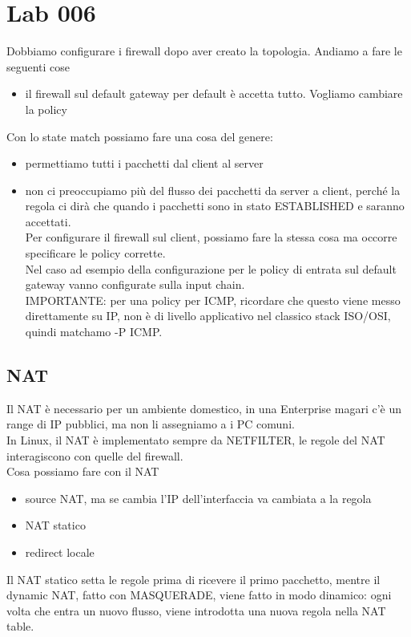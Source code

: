 \documentclass[12pt, oneside]{extbook} %
\begin{document}
\section*{Lab 006}
Dobbiamo configurare i firewall dopo aver creato la topologia. Andiamo a fare le seguenti cose
\begin{itemize}
\item il firewall sul default gateway per default è accetta tutto. Vogliamo cambiare la policy
\end{itemize}
Con lo state match possiamo fare una cosa del genere:
\begin{itemize}
\item permettiamo tutti i pacchetti dal client al server
\item non ci preoccupiamo più del flusso dei pacchetti da server a client, perché la regola ci dirà che quando i pacchetti sono in stato ESTABLISHED e saranno accettati.
\\Per configurare il firewall sul client, possiamo fare la stessa cosa ma occorre specificare le policy corrette.
\\Nel caso ad esempio della configurazione per le policy di entrata sul default gateway vanno configurate sulla input chain.
\\ IMPORTANTE: per una policy per ICMP, ricordare che questo viene messo direttamente su IP, non è di livello applicativo nel classico stack ISO/OSI, quindi matchamo -P ICMP.
\end{itemize}

\subsection{NAT}
Il NAT è necessario per un ambiente domestico, in una Enterprise magari c'è un range di IP pubblici, ma non li assegniamo a i PC comuni.
\\In Linux, il NAT è implementato sempre da NETFILTER, le regole del NAT interagiscono con quelle del firewall.
\\Cosa possiamo fare con il NAT
\begin{itemize}
\item source NAT, ma se cambia l'IP dell'interfaccia va cambiata a la regola
\item NAT statico
\item redirect locale
\end{itemize}
Il NAT statico setta le regole prima di ricevere il primo pacchetto, mentre il dynamic NAT, fatto con MASQUERADE, viene fatto in modo dinamico: ogni volta che entra un nuovo flusso, viene introdotta una nuova regola nella NAT table.
\end{document}
